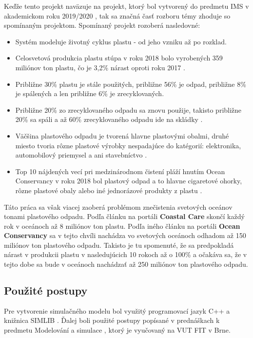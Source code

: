 \documentclass[a4paper, 11pt]{article}
\begin{document}
Keďže tento projekt naväzuje na projekt, ktorý bol vytvorený do predmetu IMS v akademickom roku 2019/2020 \cite{IMS_project}, tak sa značná časť rozboru témy zhoduje so spomínaným projektom. Spomínaný projekt rozoberá nasledovné:

\begin{itemize}
	\item Systém modeluje životný cyklus plastu - od jeho vzniku až po rozklad.
	\item Celosvetová produkcia plastu stúpa v roku 2018 bolo vyrobených 359 miliónov ton plastu, čo je 3,2\% nárast oproti roku 2017 \cite{plastic_Europe}.
	\item Približne 30\% plastu je stále použitých, približne 56\% je odpad, približne 8\% je spálených a len približne 6\% je zrecyklovaných.
	\item Približne 20\% zo zrecyklovaného odpadu sa znovu použije, takisto približne 20\% sa spáli a až 60\% zrecyklovaného odpadu ide na skládky \cite{plastic_pollution_stats} \cite{plastic_sciencemag}.
	\item Väčšina plastového odpadu je tvorená hlavne plastovými obalmi, druhé miesto tvoria rôzne plastové výrobky nespadajúce do katégorií: elektronika,
	      automobilový priemysel a ani stavebníctvo \cite{plastic_graph}.
	\item Top 10 nájdených vecí pri medzinárodnom čistení pláží hnutím Ocean Conservancy v roku 2018 bol plastový odpad a to hlavne cigaretové ohorky, rôzne plastové obaly	alebo iné jednorázové produkty z plastu \cite{beach_cleanup}.
\end{itemize}

Táto práca sa však viacej zaoberá problémom znečistenia svetových oceánov tonami plastového odpadu. Podľa článku na portáli \textbf{Coastal Care} \cite{plastic_pollution} skončí každý rok v oceánoch až 8 miliónov ton plastu. Podľa iného článku na portáli \textbf{Ocean Conservancy} \cite{ocean_conservancy} sa v tejto chvíli nachádza vo svetových oceánoch odhadom až 150 miliónov ton plastového odpadu. Takisto je tu spomenuté, že sa predpokladá nárast v produkcii plastu v nasledujúcich 10 rokoch až o 100\% a očakáva sa, že v tejto dobe sa bude v oceánoch nachádzať až 250 miliónov ton plastového odpadu.

\subsection{Použité postupy}

Pre vytvorenie simulačného modelu bol využitý programovací jazyk C++ a knižnica SIMLIB \cite{SIMLIB}. Ďalej boli použité postupy popísané v prednáškach k predmetu Modelování a simulace \cite{IMS_slides}, ktorý je vyučovaný na VUT FIT v Brne.
\end{document}
